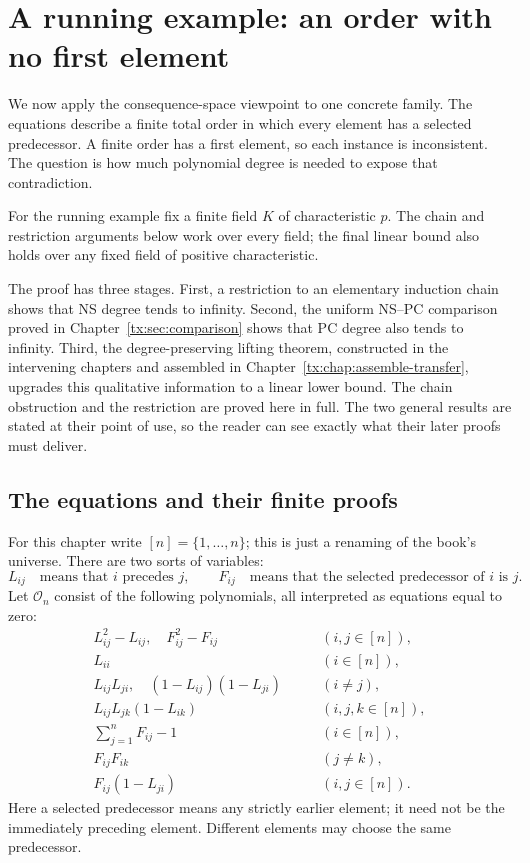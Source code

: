 \chapter{A running example: an order with no first element}
\label{tx:ch:running-order}
We now apply the consequence-space viewpoint to one concrete family.
The equations describe a finite total order in which every element has
a selected predecessor. A finite order has a first element, so each
instance is inconsistent. The question is how much polynomial degree
is needed to expose that contradiction.

For the running example fix a finite field $K$ of characteristic $p$.
The chain and restriction arguments below work over every field; the
final linear bound also holds over any fixed field of positive characteristic.

The proof has three stages. First, a restriction to an elementary
induction chain shows that NS degree tends to infinity. Second, the
uniform NS--PC comparison proved in Chapter~\ref{tx:sec:comparison}
shows that PC degree also tends to infinity. Third, the degree-preserving
lifting theorem, constructed in the intervening chapters and assembled
in Chapter~\ref{tx:chap:assemble-transfer}, upgrades this qualitative
information to a linear lower bound. The chain obstruction and the
restriction are proved here in full. The two general results are stated
at their point of use, so the reader can see exactly what their later
proofs must deliver.

\section{The equations and their finite proofs}
For this chapter write $[n]=\{1,\ldots,n\}$; this is just a
renaming of the book's universe. There are two sorts of variables:
\[
 L_{ij}\quad\text{means that }i\text{ precedes }j,\qquad
 F_{ij}\quad\text{means that the selected predecessor of }i\text{ is }j.
\]
Let $\mathcal O_n$ consist of the following polynomials, all interpreted
as equations equal to zero:
\begin{subequations}\label{tx:eq:running-order-axioms}
\begin{align}
 L_{ij}^2-L_{ij},\quad F_{ij}^2-F_{ij}
       &\qquad(i,j\in[n]),\label{tx:eq:order-Boolean}\\
 L_{ii}&\qquad(i\in[n]),\label{tx:eq:order-irreflexive}\\
 L_{ij}L_{ji},\quad(1-L_{ij})(1-L_{ji})
       &\qquad(i\ne j),\label{tx:eq:order-total}\\
 L_{ij}L_{jk}(1-L_{ik})
       &\qquad(i,j,k\in[n]),\label{tx:eq:order-transitive}\\
 \sum_{j=1}^nF_{ij}-1
       &\qquad(i\in[n]),\label{tx:eq:order-function-total}\\
 F_{ij}F_{ik}&\qquad(j\ne k),\label{tx:eq:order-function-collision}\\
 F_{ij}(1-L_{ji})&\qquad(i,j\in[n]).\label{tx:eq:order-predecessor}
\end{align}
\end{subequations}
Here a selected predecessor means any strictly earlier element; it
need not be the immediately preceding element. Different elements may
choose the same predecessor.

